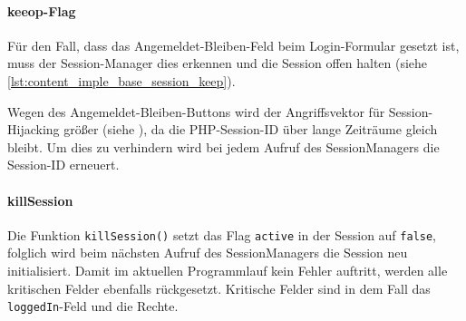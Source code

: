 \paragraph{keeop-Flag\\}
Für den Fall, dass das Angemeldet-Bleiben-Feld beim Login-Formular gesetzt ist, muss der Session-Manager dies erkennen und die Session offen halten (siehe \autoref{lst:content_imple_base_session_keep}).


Wegen des Angemeldet-Bleiben-Buttons wird der Angriffsvektor für Session-Hijacking größer (siehe ), da die PHP-Session-ID über lange Zeiträume gleich bleibt. Um dies zu verhindern wird bei jedem Aufruf des SessionManagers die Session-ID erneuert.


\paragraph{killSession\\}
Die Funktion \texttt{killSession()} setzt das Flag \texttt{active} in der Session auf \texttt{false}, folglich wird beim nächsten Aufruf des SessionManagers die Session neu initialisiert. Damit im aktuellen Programmlauf kein Fehler auftritt, werden alle kritischen Felder ebenfalls rückgesetzt. Kritische Felder sind in dem Fall das \texttt{loggedIn}-Feld und die Rechte.


